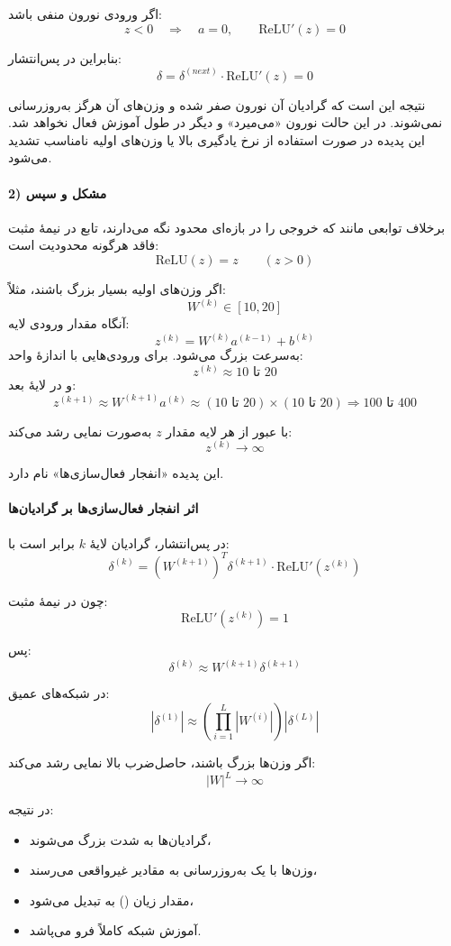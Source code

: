 \documentclass{article}
\begin{document}
اگر ورودی نورون منفی باشد:
\[
z < 0 \quad \Rightarrow \quad a = 0, \qquad \text{ReLU}'(z)=0
\]

بنابراین در پس‌انتشار:
\[
\delta = \delta^{(next)} \cdot \text{ReLU}'(z) = 0
\]

نتیجه این است که گرادیان آن نورون صفر شده و وزن‌های آن هرگز به‌روزرسانی نمی‌شوند. در این حالت نورون «می‌میرد» و دیگر در طول آموزش فعال نخواهد شد. این پدیده در صورت استفاده از نرخ یادگیری بالا یا وزن‌های اولیه نامناسب تشدید می‌شود.

\paragraph{2) مشکل  و سپس }

برخلاف توابعی مانند  که خروجی را در بازه‌ای محدود نگه می‌دارند، تابع  در نیمهٔ مثبت فاقد هرگونه محدودیت است:
\[
\text{ReLU}(z) = z \qquad (z>0)
\]

اگر وزن‌های اولیه بسیار بزرگ باشند، مثلاً:
\[
W^{(k)} \in [10, 20]
\]
آنگاه مقدار ورودی لایه:
\[
z^{(k)} = W^{(k)} a^{(k-1)} + b^{(k)}
\]
به‌سرعت بزرگ می‌شود. برای ورودی‌هایی با اندازهٔ واحد:
\[
z^{(k)} \approx 10 \text{ تا } 20
\]
و در لایهٔ بعد:
\[
z^{(k+1)} \approx W^{(k+1)} a^{(k)} \approx (10 \text{ تا } 20)\times(10 \text{ تا } 20)
\Rightarrow 100 \text{ تا } 400
\]

با عبور از هر لایه مقدار $z$ به‌صورت نمایی رشد می‌کند:
\[
z^{(k)} \rightarrow \infty
\]

این پدیده «انفجار فعال‌سازی‌ها» نام دارد.

\paragraph{اثر انفجار فعال‌سازی‌ها بر گرادیان‌ها}
در پس‌انتشار، گرادیان لایهٔ $k$ برابر است با:
\[
\delta^{(k)} = (W^{(k+1)})^T \delta^{(k+1)} \cdot \text{ReLU}'(z^{(k)})
\]

چون در نیمهٔ مثبت:
\[
\text{ReLU}'(z^{(k)}) = 1
\]

پس:
\[
\delta^{(k)} \approx W^{(k+1)} \delta^{(k+1)}
\]

در شبکه‌های عمیق:
\[
|\delta^{(1)}|
\approx 
\left(\prod_{i=1}^{L} |W^{(i)}|\right)
|\delta^{(L)}|
\]

اگر وزن‌ها بزرگ باشند، حاصل‌ضرب بالا نمایی رشد می‌کند:
\[
|W|^L \rightarrow \infty
\]

در نتیجه:
\begin{itemize}
	\item گرادیان‌ها به شدت بزرگ می‌شوند،
	\item وزن‌ها با یک به‌روزرسانی به مقادیر غیرواقعی می‌رسند،
	\item مقدار زیان () به  تبدیل می‌شود،
	\item آموزش شبکه کاملاً فرو می‌پاشد.
\end{itemize}
\end{document}
